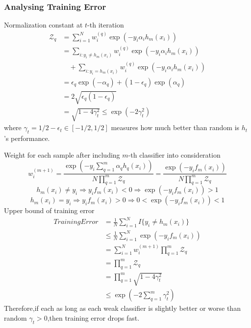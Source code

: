 \documentclass{beamer}
\begin{document}
\begin{CJK*}{UTF8}{gbsn}
\begin{frame}[allowframebreaks]\frametitle{Analysing Training Error}
Normalization constant at $t$-th iteration
\begin{equation}
\begin{array}{ll}
\mathcal{Z}_q&=\sum_{i=1}^Nw_i^{(q)}\exp(-y_i\alpha_i h_m(x_i))\\
&=\sum_{i:y_i\neq h_m(x_i)}w_i^{(q)}\exp(-y_i\alpha_i h_m(x_i))\\
&\quad+\sum_{i:y_i=h_m(x_i)}w_i^{(q)}\exp(-y_i\alpha_i h_m(x_i))\\
&=\epsilon_q\exp(-\alpha_q)+(1-\epsilon_q)\exp(\alpha_q)\\
&=2\sqrt{\epsilon_q (1-\epsilon_q)}\\
&=\sqrt{1-4\gamma_t^2}\leq \exp(-2\gamma_t^2)
\end{array}
\end{equation}
where \(\gamma_t=1/2-\epsilon_t\in [-1/2,1/2]\) measures how much better than random is $h_t$'s performance.

Weight for each sample after including $m$-th classifier into consideration
\begin{equation}
w_i^{(m+1)}=\frac{\exp(-y_i\sum_{q=1}^m\alpha_qh_q(x_i))}{N\prod_{q=1}^m\mathcal{Z}_q}=\frac{\exp(-y_if_m(x_i))}{N\prod_{q=1}^m\mathcal{Z}_q}
\end{equation}
\begin{equation}
h_m(x_i)\neq y_i\Rightarrow y_if_m(x_i)<0\Rightarrow\exp(-y_if_m(x_i))>1
\end{equation}
\begin{equation}
h_m(x_i)=y_i\Rightarrow y_if_m(x_i)>0\Rightarrow 0<\exp(-y_if_m(x_i))<1
\end{equation}
Upper bound of training error
\begin{equation}
\begin{array}{ll}
TrainingError&=\frac{1}{N}\sum_{i=1}^NI\{y_i\neq h_m(x_i)\}\\
&\leq\frac{1}{N}\sum_{i=1}^N\exp(-y_if_m(x_i))\\
&=\sum_{i=1}^Nw_i^{(m+1)}\prod_{q=1}^m\mathcal{Z}_q\\
&=\prod_{q=1}^m\mathcal{Z}_q\\
&=\prod_{q=1}^m\sqrt{1-4\gamma_t^2}\\
&\leq\exp(-2\sum_{q=1}^m\gamma_t^2)
\end{array}
\end{equation}
Therefore,if each as long as each weak classifier is slightly better or worse than random $\gamma_t>0$,then training error drops fast.
\end{frame}
\end{CJK*}
\end{document}
